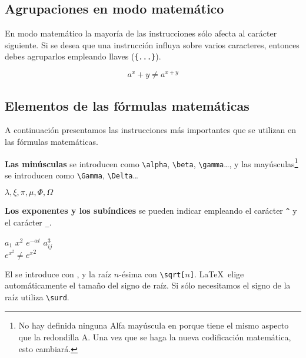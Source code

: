 \subsection{Agrupaciones en modo matemático}

En  modo  matemático  la  mayoría de  las  instrucciones  sólo  afecta
al  carácter  siguiente.  Si  se desea  que  una  instrucción  influya
sobre varios  caracteres, entonces  debes agruparlos  empleando llaves
(\verb|{...}|).

\begin{example}
\begin{equation}
a^x+y \neq a^{x+y}
\end{equation}
\end{example}
 
\subsection{Elementos de las fórmulas matemáticas}

A continuación  presentamos las  instrucciones más importantes  que se
utilizan en las fórmulas matemáticas.

\textbf{Las        minúsculas}   se    introducen
como   \verb|\alpha|,   \verb|\beta|,   \verb|\gamma|\ldots,   y   las
mayúsculas\footnote{No   hay  definida   ninguna  Alfa   mayúscula  en
\LaTeXe{} porque tiene  el mismo aspecto que la redondilla  A. Una vez
que  se haga  la  nueva codificación  matemática,  esto cambiará.}  se
introducen como \verb|\Gamma|, \verb|\Delta|\ldots

\begin{example}
$\lambda,\xi,\pi,\mu,\Phi,\Omega$
\end{example}

%
\textbf{Los exponentes y los subíndices} se pueden indicar empleando
el carácter \verb|^| y el carácter
\verb|_|.

\begin{example}
$a_{1}$ \qquad $x^{2}$ \qquad
$e^{-\alpha t}$ \qquad
$a^{3}_{ij}$\\
$e^{x^2} \neq {e^x}^2$
\end{example}

El \textbf{}  se introduce con , y
la raíz  \mbox{$n$-ésima} con \verb|\sqrt[|$n$\verb|]|.  \LaTeX\ elige
automáticamente el  tamaño del signo  de raíz. Si sólo  necesitamos el
signo de la raíz utiliza \verb|\surd|.

